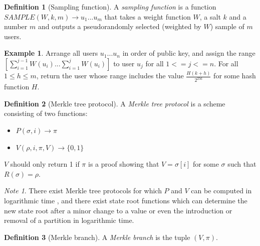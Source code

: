 \documentclass[11pt,a4paper]{report}
\theoremstyle{plain}
\theoremstyle{definition}
\newtheorem{defn}{Definition}[chapter]
\newtheorem{exmp}{Example}[section]
\theoremstyle{remark}
\newtheorem*{note}{Note}
\begin{document}
\begin{defn}[Sampling function]
A \emph{sampling function} is a function $SAMPLE(W, k, m) \rightarrow {u_1 ... u_m}$ that takes a weight function $W$, a salt $k$ and a number $m$ and outputs a pseudorandomly selected (weighted by $W$) sample of $m$ users.
\end{defn}

\begin{exmp}
Arrange all users $u_1 ... u_n$ in order of public key, and assign the range $[\sum_{i=1}^{j-1} W(u_i)...\sum_{i=1}^j W(u_i)]$ to user $u_j$ for all $1 <= j <= n$. For all $1 \le h \le m$, return the user whose range includes the value $\frac{H(k + h)}{2^{256}}$ for some hash function $H$.
\end{exmp}

\begin{defn}[Merkle tree protocol]
A \emph{Merkle tree protocol} is a scheme consisting of two functions:
\begin{itemize}
\item
$P(\sigma, i) \rightarrow \pi$
\item
$V(\rho, i, \pi, V) \rightarrow \{0, 1\}$
\end{itemize}
$V$ should only return 1 if $\pi$ is a proof showing that $V = \sigma[i]$ for some $\sigma$ such that $R(\sigma) = \rho$.
\end{defn}

\begin{note}
There exist Merkle tree protocols for which $P$ and $V$ can be computed in logarithmic time \citep{merkle_method_1982}, and there exist state root functions which can determine the new state root after a minor change to a value or even the introduction or removal of a partition in logarithmic time.
\end{note}

\begin{defn}[Merkle branch]
A \emph{Merkle branch} is the tuple $(V, \pi)$.
\end{defn}
\end{document}
